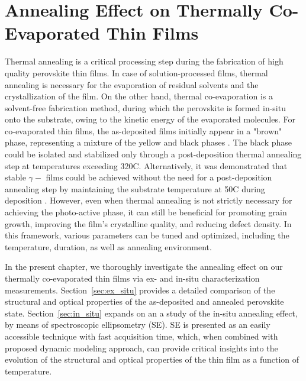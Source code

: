 \chapter{Annealing Effect on Thermally Co-Evaporated  Thin Films}\label{ch:ellipsometry}

Thermal annealing is a critical processing step during the fabrication of high quality perovskite thin films. In case of solution-processed films, thermal annealing is necessary for the evaporation of residual solvents and the crystallization of the film. On the other hand, thermal co-evaporation is a solvent-free fabrication method, during which the perovskite is formed in-situ onto the substrate, owing to the kinetic energy of the evaporated molecules. For co-evaporated  thin films, the as-deposited films initially appear in a "brown" phase, representing a mixture of the yellow and black phases \cite{Frolova2017HighlyPbIsub2/sub, PintorMonroy2021All-EvaporatedApplications}. The black phase could be isolated and stabilized only through a post-deposition thermal annealing step at temperatures exceeding 320\degree C. Alternatively, it was demonstrated that stable $\gamma-$ films could be achieved without the need for a post-deposition annealing step by maintaining the substrate temperature at 50\degree C during deposition \cite{Dong2021High-TemperatureCells}. However, even when thermal annealing is not strictly necessary for achieving the photo-active phase, it can still be beneficial for promoting grain growth, improving the film's crystalline quality, and reducing defect density. In this framework, various parameters can be tuned and optimized, including the temperature, duration, as well as annealing environment.

In the present chapter, we thoroughly investigate the annealing effect on our thermally co-evaporated  thin films via ex- and in-situ characterization measurements. Section~\ref{sec:ex_situ} provides a detailed comparison of the structural and optical properties of the as-deposited and annealed perovskite state. Section~\ref{sec:in_situ} expands on an a study of the in-situ annealing effect, by means of spectroscopic ellipsometry (SE). SE is presented as an easily accessible technique with fast acquisition time, which, when combined with proposed dynamic modeling approach, can provide critical insights into the evolution of the structural and optical properties of the thin film as a function of temperature. 


